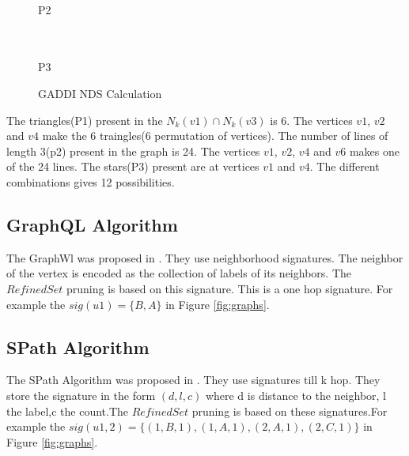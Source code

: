 \begin{figure}
\begin{minipage}{.35\textwidth}
\\ P2\\ \hfill \\
\\ P3
\end{minipage}
\caption{GADDI NDS Calculation}
\label{fig:gaddi}
\end{figure}
\hspace{10mm}The triangles(P1) present in the $N_k(v1) \cap N_k(v3)$ is 6. The vertices $v1$, $v2$ and $v4$ make the 6 traingles(6 permutation of vertices). The number of lines of length 3(p2) present in the graph is 24. The vertices $v1$, $v2$, $v4$ and $v6$ makes one of the 24 lines. The stars(P3) present are at vertices $v1$ and $v4$. The different combinations gives 12 possibilities.
 \subsection{GraphQL Algorithm}
 \label{sec:gql}
\hspace{10mm}The GraphWl was proposed in \cite{GQL}. They use neighborhood signatures. The neighbor of the vertex is encoded as the collection of labels of its neighbors.  The $RefinedSet$  pruning is based on this signature. This is a one hop signature. For example the $sig(u1) =\{B,A\}$ in Figure \ref{fig:graphs}.

\subsection{SPath Algorithm}
\label{sec:spath}
\hspace{10mm}The SPath Algorithm was proposed in \cite{SPA}. They use signatures till k hop. They store the signature in the form $(d,l,c)$ where d is distance to the neighbor, l the label,c the  count.The $RefinedSet$  pruning is based on these signatures.For example the $sig(u1,2) = \{(1,B,1),(1,A,1),(2,A,1),(2,C,1)\}$ in Figure \ref{fig:graphs}.
